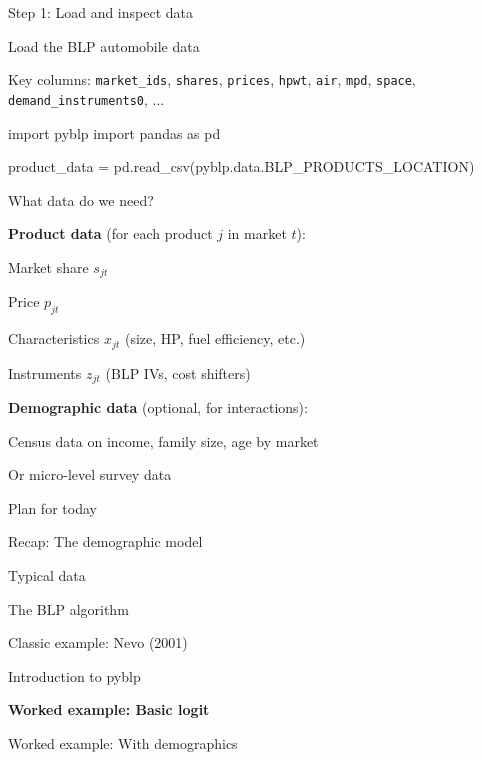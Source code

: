 \documentclass[notes,11pt, aspectratio=169]{beamer}
\newenvironment{wideitemize}{\itemize\addtolength{\itemsep}{10pt}}{\enditemize}
\newenvironment{wideenumerate}{\enumerate\addtolength{\itemsep}{10pt}}{\endenumerate}
\begin{document}
\begin{frame}[fragile]{Step 1: Load and inspect data}
\begin{wideitemize}
	\item Load the BLP automobile data
	\item Key columns: \texttt{market\_ids}, \texttt{shares}, \texttt{prices}, \texttt{hpwt}, \texttt{air}, \texttt{mpd}, \texttt{space}, \texttt{demand\_instruments0}, ...
\end{wideitemize}
\vspace{5pt}
\begin{pycode}
import pyblp
import pandas as pd

product_data = pd.read_csv(pyblp.data.BLP_PRODUCTS_LOCATION)
\end{pycode}
\end{frame}

\begin{frame}{What data do we need?}
	\begin{wideitemize}
		\item \textbf{Product data} (for each product $j$ in market $t$):
		\begin{wideitemize}
			\vspace{5pt}
			\item Market share $s_{jt}$
			\item Price $p_{jt}$
			\item Characteristics $x_{jt}$ (size, HP, fuel efficiency, etc.)
			\item Instruments $z_{jt}$ (BLP IVs, cost shifters)
		\end{wideitemize}
		\item \textbf{Demographic data} (optional, for interactions):
		\begin{wideitemize}
			\vspace{5pt}
			\item Census data on income, family size, age by market
			\item Or micro-level survey data
		\end{wideitemize}
	\end{wideitemize}
\end{frame}

\begin{frame}{Plan for today}
  \begin{wideenumerate}
    \item Recap: The demographic model
    \item Typical data
    \item The BLP algorithm
    \item Classic example: Nevo (2001)
    \item Introduction to pyblp
    \item \textbf{Worked example: Basic logit}
    \item Worked example: With demographics
  \end{wideenumerate}
\end{frame}
\end{document}
